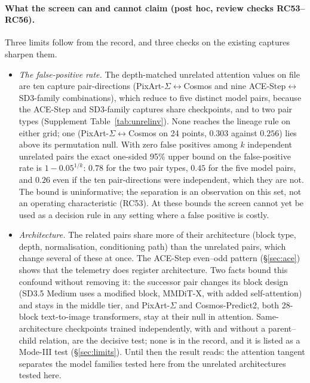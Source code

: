 \documentclass[11pt]{article}
\begin{document}
\paragraph{What the screen can and cannot claim (post hoc, review checks RC53--RC56).} Three limits follow from the record, and three checks on the existing captures sharpen them.
\begin{itemize}
 \item \emph{The false-positive rate.} The depth-matched unrelated attention values on file are ten capture pair-directions (PixArt-$\Sigma$$\leftrightarrow$Cosmos and nine ACE-Step$\leftrightarrow$SD3-family combinations), which reduce to five distinct model pairs, because the ACE-Step and SD3-family captures share checkpoints, and to two pair types (Supplement Table~\ref{tab:unrelinv}). None reaches the lineage rule on either grid; one (PixArt-$\Sigma$$\leftrightarrow$Cosmos on 24 points, $0.303$ against $0.256$) lies above its permutation null. With zero false positives among $k$ independent unrelated pairs the exact one-sided 95\% upper bound on the false-positive rate is $1-0.05^{1/k}$: $0.78$ for the two pair types, $0.45$ for the five model pairs, and $0.26$ even if the ten pair-directions were independent, which they are not. The bound is uninformative; the separation is an observation on this set, not an operating characteristic (RC53). At these bounds the screen cannot yet be used as a decision rule in any setting where a false positive is costly.
 \item \emph{Architecture.} The related pairs share more of their architecture (block type, depth, normalisation, conditioning path) than the unrelated pairs, which change several of these at once. The ACE-Step even--odd pattern (\S\ref{sec:ace}) shows that the telemetry does register architecture. Two facts bound this confound without removing it: the successor pair changes its block design (SD3.5 Medium uses a modified block, MMDiT-X, with added self-attention) and stays in the middle tier, and PixArt-$\Sigma$ and Cosmos-Predict2, both 28-block text-to-image transformers, stay at their null in attention. Same-architecture checkpoints trained independently, with and without a parent--child relation, are the decisive test; none is in the record, and it is listed as a Mode-III test (\S\ref{sec:limits}). Until then the result reads: the attention tangent separates the model families tested here from the unrelated architectures tested here.

\end{itemize}
\end{document}
